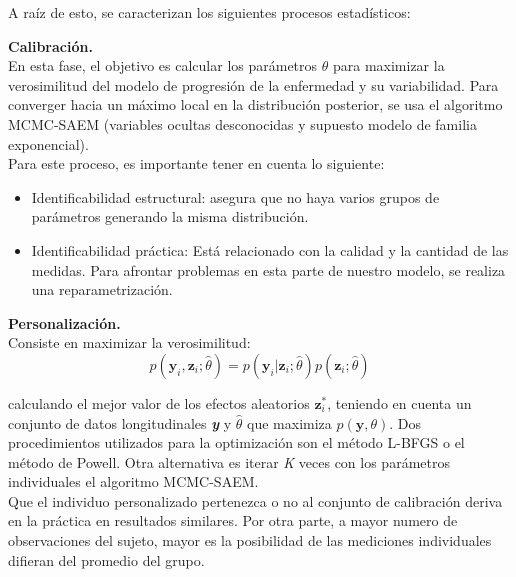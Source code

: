 	A raíz de esto, se caracterizan los siguientes procesos estadísticos:
	\begin{description}
		\item {\textbf{Calibración.}}\\
		En esta fase, el objetivo es calcular los parámetros $\hat{\theta}$ para maximizar la verosimilitud del modelo de progresión de la enfermedad y su variabilidad. Para converger hacia un máximo local en la distribución posterior, se usa el algoritmo MCMC-SAEM (variables ocultas desconocidas y supuesto modelo de familia exponencial). \\
		
		Para este proceso, es importante tener en cuenta lo siguiente:
		\begin{itemize}
			\item Identificabilidad estructural: asegura que no haya varios grupos de parámetros generando la misma distribución.
			\item Identificabilidad práctica: Está relacionado con la calidad y la cantidad de las medidas. Para afrontar problemas en esta parte de nuestro modelo, se realiza una reparametrización.
		\end{itemize}
		\item {\textbf{Personalización.}}\\
		Consiste en maximizar la verosimilitud:
		\begin{equation}
			p(\mathbf{y}_{i}, \mathbf{z}_{i};\hat{\theta})=p(\mathbf{y}_{i}| \mathbf{z}_{i};\hat{\theta})p( \mathbf{z}_{i};\hat{\theta})
		\end{equation} 
		
		calculando el mejor valor de los efectos aleatorios $\mathbf{z}_{i}^{*}$, teniendo en cuenta un conjunto de datos longitudinales \textit{\textbf{y}} y $\hat{\theta}$ que maximiza $p(\mathbf{y},\theta)$. Dos procedimientos utilizados para la optimización son el método L-BFGS o el método de Powell. Otra alternativa es iterar \textit{K} veces con los parámetros individuales el algoritmo MCMC-SAEM.\\
		
		Que el individuo personalizado pertenezca o no al conjunto de calibración deriva en la práctica en resultados similares. Por otra parte, a mayor numero de observaciones del sujeto, mayor es la posibilidad de las mediciones individuales difieran del promedio del grupo.	
		

\end{description}
